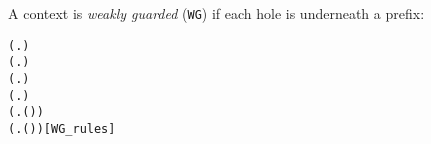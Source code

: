 A context is \emph{weakly guarded} (\texttt{WG}) if each hole is
underneath a prefix:
\begin{alltt}
 (\HOLTokenLambda{}. )
  \HOLSymConst{\HOLTokenImp{}}  (\HOLTokenLambda{}.  )
  \HOLSymConst{\HOLTokenConj{}}   \HOLSymConst{\HOLTokenImp{}}  (\HOLTokenLambda{}.   \HOLSymConst{\ensuremath{+}}  )
  \HOLSymConst{\HOLTokenConj{}}   \HOLSymConst{\HOLTokenImp{}}  (\HOLTokenLambda{}.   \HOLSymConst{\ensuremath{\parallel}}  )
  \HOLSymConst{\HOLTokenImp{}}  (\HOLTokenLambda{}. \HOLSymConst{\ensuremath{\nu}}  ( ))
  \HOLSymConst{\HOLTokenImp{}}  (\HOLTokenLambda{}.  ( ) )\hfill{[WG_rules]}
\end{alltt}

